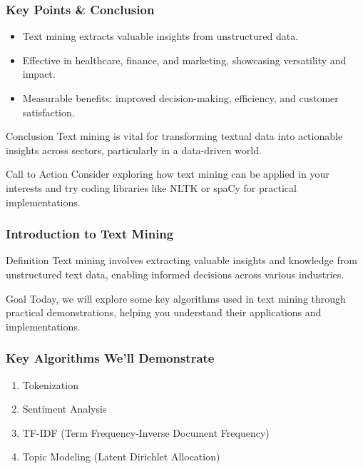 \documentclass[aspectratio=169]{beamer}
\begin{document}
\begin{frame}[fragile]
    \frametitle{Key Points \& Conclusion}
    
    \begin{itemize}
        \item Text mining extracts valuable insights from unstructured data.
        \item Effective in healthcare, finance, and marketing, showcasing versatility and impact.
        \item Measurable benefits: improved decision-making, efficiency, and customer satisfaction.
    \end{itemize}
    
    \begin{block}{Conclusion}
        Text mining is vital for transforming textual data into actionable insights across sectors, particularly in a data-driven world.
    \end{block}
    
    \begin{block}{Call to Action}
        Consider exploring how text mining can be applied in your interests and try coding libraries like NLTK or spaCy for practical implementations.
    \end{block}
\end{frame}

\begin{frame}
    \titlepage
\end{frame}

\begin{frame}
    \frametitle{Introduction to Text Mining}
    \begin{block}{Definition}
        Text mining involves extracting valuable insights and knowledge from unstructured text data, enabling informed decisions across various industries.
    \end{block}

    \begin{block}{Goal}
        Today, we will explore some key algorithms used in text mining through practical demonstrations, helping you understand their applications and implementations.
    \end{block}
\end{frame}

\begin{frame}
    \frametitle{Key Algorithms We'll Demonstrate}
    \begin{enumerate}
        \item Tokenization
        \item Sentiment Analysis
        \item TF-IDF (Term Frequency-Inverse Document Frequency)
        \item Topic Modeling (Latent Dirichlet Allocation)
    \end{enumerate}
\end{frame}
\end{document}
